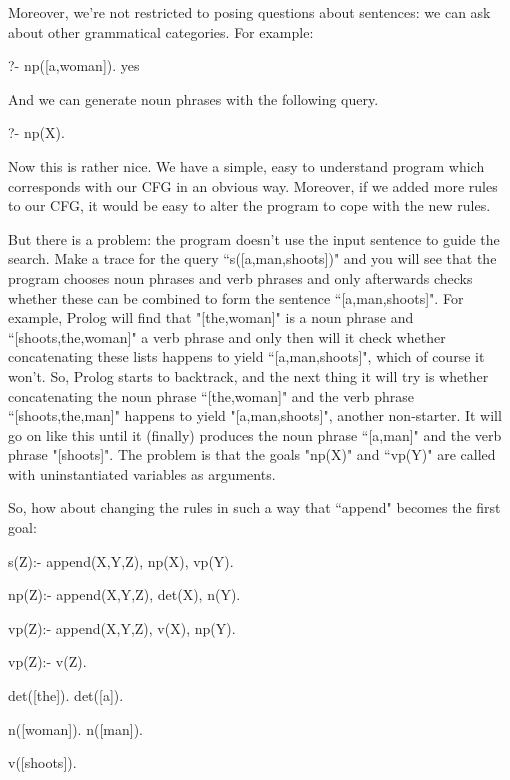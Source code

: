 Moreover, we're not restricted to posing questions about sentences: we
can ask about other grammatical categories. For example:
\begin{LPNcodedisplay}
?- np([a,woman]).
yes
\end{LPNcodedisplay}

And we can generate noun phrases with the following query.
\begin{LPNcodedisplay}
?- np(X).
\end{LPNcodedisplay}


Now this is rather nice.  We have a simple, easy to understand program
which corresponds with our CFG in an obvious way.  Moreover, if we
added more rules to our CFG, it would be easy to alter the program to
cope with the new rules.

But there is a problem: the program doesn't use the input sentence to
guide the search. Make a trace for the query ``s([a,man,shoots])"
and you will see that the program chooses
noun phrases and verb
phrases and only afterwards checks whether these can be combined to
form the sentence ``[a,man,shoots]". For example, Prolog will find that
"[the,woman]" is a noun phrase and ``[shoots,the,woman]" a
verb phrase and only then will it check whether concatenating these
lists happens to yield ``[a,man,shoots]", which of course
it won't. So, Prolog starts to backtrack, and the next thing it will try
is whether concatenating the noun phrase ``[the,woman]" and the
verb phrase ``[shoots,the,man]" happens to yield
"[a,man,shoots]", another non-starter.
It will go on like this until it (finally)
produces the noun phrase ``[a,man]" and the verb phrase
"[shoots]". The problem is that the goals
"np(X)" and ``vp(Y)" are called with uninstantiated variables
as arguments.

So, how about changing the rules in such a way that ``append"
becomes the first goal:
\begin{LPNcodedisplay}
s(Z):- append(X,Y,Z), np(X), vp(Y).

np(Z):- append(X,Y,Z), det(X), n(Y).

vp(Z):- append(X,Y,Z), v(X), np(Y).

vp(Z):- v(Z).

det([the]).
det([a]).

n([woman]).
n([man]).

v([shoots]).
\end{LPNcodedisplay}

